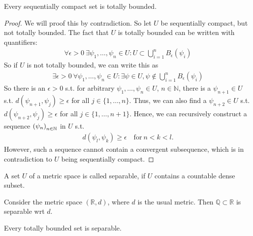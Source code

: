 \begin{theorem}\label{thrm:seq_compact_set_tot_bound}
	Every sequentially compact set is totally bounded.
\end{theorem}

\begin{proof}
	We will proof this by contradiction. So let $U$ be sequentially compact, but not totally bounded. The fact that $U$ is totally bounded can be written with quantifiers:
	\begin{align*}
		\forall \epsilon > 0\ \exists \psi_1, \dots, \psi_n\in U: U\subset \bigcup_{i=1}^{n}B_{\epsilon}(\psi_i)
	\end{align*}
	So if $U$ is not totally bounded, we can write this as 
	\begin{align*}
		\exists\epsilon > 0\ \forall \psi_1, \dots, \psi_n\in U:\exists \psi\in U, \psi\notin\bigcup_{i = 1}^{n}B_{\epsilon}(\psi_i)
	\end{align*}		
	So there is an $\epsilon > 0$ s.t. for arbitrary $\psi_1, \dots, \psi_n\in U$, $n\in\mathbb N$, there is a $\psi_{n+1}\in U$ s.t. $d(\psi_{n+1}, \psi_j) \geq \epsilon$ for all $j\in\{1, \dots, n\}$. Thus, we can also find a $\psi_{n+2}\in U$ s.t. $d(\psi_{n+2}, \psi_j) \geq \epsilon$ for all $j\in \{1, \dots, n+1\}$. Hence, we can recursively construct a sequence $\seq[\psi_n]$ in $U$ s.t.
	\begin{align*}
		d(\psi_l, \psi_k) \geq\epsilon\quad \text{for}\ n < k < l.
	\end{align*}
	However, such a sequence cannot contain a convergent subsequence, which is in contradiction to $U$ being sequentially compact.
\end{proof}

\begin{defn}
	A set $U$ of a metric space is called separable, if $U$ contains a countable dense subset.
\end{defn}

\begin{exmp}
	Consider the metric space $(\mathbb R, d)$, where $d$ is the usual metric. Then $\mathbb Q\subset\mathbb R$ is separable wrt $d$.
\end{exmp}

\begin{theorem}
	Every totally bounded set is separable.
\end{theorem}


